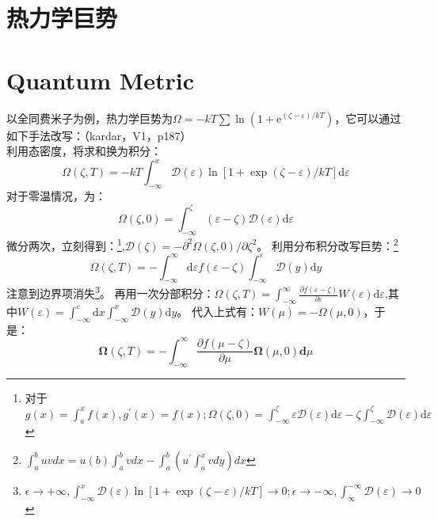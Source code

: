 \documentclass[10pt,openany]{book}
\theoremstyle{thmstyle} %
\theoremstyle{defstyle} %
\theoremstyle{prostyle} %
\begin{document}
\section{热力学巨势}
\section{Quantum Metric}

以全同费米子为例，热力学巨势为$ \Omega=-k T \sum \ln \left(1+\mathrm{e}^{(\zeta-\varepsilon) / k T}\right) $，它可以通过如下手法改写：（kardar，V1，p187）\\

利用态密度，将求和换为积分：
\begin{equation}
	\Omega(\zeta, T)=-k T \int_{-\infty}^x \mathscr{D}(\varepsilon) \ln [1+\exp (\zeta-\varepsilon) / k T] \mathrm{d} \varepsilon
\end{equation}
对于零温情况，为：
\begin{equation}
	\Omega(\zeta, 0)=\int_{-\infty}^\zeta(\varepsilon-\zeta) \mathscr{D}(\varepsilon) \mathrm{d} \varepsilon
\end{equation}
微分两次，立刻得到：\footnote{对于$ g(x)=\int_{a}^{x}f(x),g^{\prime}(x)=f(x);\Omega(\zeta, 0)= \int_{-\infty}^\zeta\varepsilon 
\mathscr{D}(\varepsilon) \mathrm{d} \varepsilon-\zeta\int_{-\infty}^\zeta\mathscr{D}(\varepsilon) \mathrm{d} \varepsilon$ },$ \mathscr{D}(\zeta)=-\partial^2 \Omega(\zeta, 0) / \partial \zeta^2 $。
利用分布积分改写巨势：\footnote{$ \int_{a}^{b} u v d x=u(b) \int_a^b v d x-\int_a^b\left(u^{\prime} \int_a^x v d y\right) d x $ }
\begin{equation}
	\Omega(\zeta, T)=-\int_{-\infty}^{\infty} \mathrm{d} \varepsilon f(\varepsilon-\zeta) \int_{-\infty}^{\varepsilon} \mathscr{D}(y) \mathrm{d} y
\end{equation} 
注意到边界项消失\footnote{$ \epsilon\to +\infty,\int_{-\infty}^x \mathscr{D}(\varepsilon) \ln [1+\exp (\zeta-\varepsilon) / k T]\to 0;\epsilon\to -\infty,\int^{-\infty}_{\infty}\mathscr{D}(\varepsilon)\to 0 $ }。
再用一次分部积分：$ \Omega(\zeta, T)=\int_{-\infty}^{\infty} \frac{\partial f(\varepsilon-\zeta)}{\partial \varepsilon} W(\varepsilon) \mathrm{d} \varepsilon $,其中$ W(\varepsilon)=\int_{-\infty}^{\varepsilon} \mathrm{d} x \int_{-\infty}^x \mathscr{D}(y) \mathrm{d} y $。
代入上式有：$ W(\mu)=-\Omega(\mu, 0) $，于是：
\begin{equation}
	\boldsymbol{\Omega}(\zeta, T)=-\int_{-\infty}^{\infty} \frac{\partial f(\mu-\zeta)}{\partial \mu} \boldsymbol{\Omega}(\mu, 0) \mathbf{d} \mu
\end{equation}   
\end{document}
